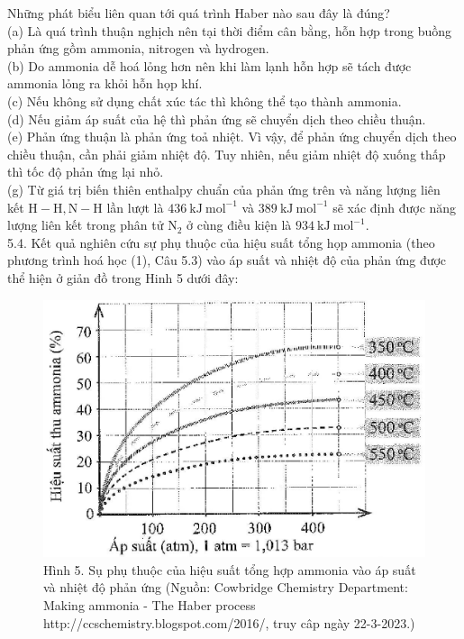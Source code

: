\documentclass[10pt]{article}
\begin{document}
Những phát biểu liên quan tới quá trình Haber nào sau đây là đúng?\\
(a) Là quá trình thuận nghịch nên tại thời điểm cân bằng, hỗn hợp trong buồng phản ứng gồm ammonia, nitrogen và hydrogen.\\
(b) Do ammonia dễ hoá lỏng hơn nên khi làm lạnh hỗn hợp sẽ tách được ammonia lỏng ra khỏi hỗn họp khí.\\
(c) Nếu không sử dụng chất xúc tác thì không thể tạo thành ammonia.\\
(d) Nếu giảm áp suất của hệ thì phản ứng sẽ chuyển dịch theo chiều thuận.\\
(e) Phản ứng thuận là phản ứng toả nhiệt. Vì vậy, để phản ứng chuyển dịch theo chiều thuận, cần phải giảm nhiệt độ. Tuy nhiên, nếu giảm nhiệt độ xuống thấp thì tốc độ phản ứng lại nhỏ.\\
(g) Từ giá trị biến thiên enthalpy chuẩn của phản ứng trên và nǎng lượng liên kết $\mathrm{H}-\mathrm{H}, \mathrm{N}-\mathrm{H}$ lần lượt là $436 \mathrm{~kJ} \mathrm{~mol}^{-1}$ và $389 \mathrm{~kJ} \mathrm{~mol}^{-1}$ sẽ xác định được năng lượng liên kết trong phân tử $\mathrm{N}_{2}$ ở cùng điều kiện là $934 \mathrm{~kJ} \mathrm{~mol}^{-1}$.\\
5.4. Kết quả nghiên cứu sự phụ thuộc của hiệu suất tổng họp ammonia (theo phương trình hoá học (1), Câu 5.3) vào áp suất và nhiệt độ của phản ứng được thể hiện ở giản đồ trong Hinh 5 dưới đây:

\begin{figure}[h]
\begin{center}
  \includegraphics[width=\textwidth]{2025_10_23_f2823ef970776205e47bg-16}
\captionsetup{labelformat=empty}
\caption{Hình 5. Sụ phụ thuộc của hiệu suất tổng hợp ammonia vào áp suất và nhiệt độ phản ứng (Nguồn: Cowbridge Chemistry Department: Making ammonia - The Haber process http://ccschemistry.blogspot.com/2016/, truy câp ngày 22-3-2023.)}
\end{center}
\end{figure}
\end{document}

